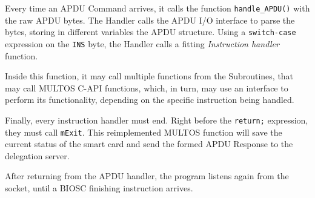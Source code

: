 Every time an APDU Command arrives, it calls the function \texttt{handle\_APDU()} with the raw APDU bytes. The Handler calls the APDU I/O interface to parse the bytes, storing in different variables the APDU structure. Using a \texttt{switch-case} expression on the \texttt{INS} byte, the Handler calls a fitting \textit{Instruction handler} function.

Inside this function, it may call multiple functions from the Subroutines, that may call MULTOS C-API functions, which, in turn, may use an interface to perform its functionality, depending on the specific instruction being handled.

Finally, every instruction handler must end. Right before the \texttt{return;} expression, they must call \texttt{mExit}. This reimplemented MULTOS function will save the current status of the smart card and send the formed APDU Response to the delegation server.

After returning from the APDU handler, the program listens again from the socket, until a BIOSC finishing instruction arrives.


